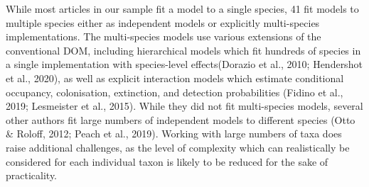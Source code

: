 \documentclass[
]{article}
\begin{document}
While most articles in our sample fit a model to a single species, 41
fit models to multiple species either as independent models or
explicitly multi-species implementations. The multi-species models use
various extensions of the conventional DOM, including hierarchical
models which fit hundreds of species in a single implementation with
species-level effects(Dorazio et al., 2010; Hendershot et al., 2020), as
well as explicit interaction models which estimate conditional
occupancy, colonisation, extinction, and detection probabilities (Fidino
et al., 2019; Lesmeister et al., 2015). While they did not fit
multi-species models, several other authors fit large numbers of
independent models to different species (Otto \& Roloff, 2012; Peach et
al., 2019). Working with large numbers of taxa does raise additional
challenges, as the level of complexity which can realistically be
considered for each individual taxon is likely to be reduced for the
sake of practicality.
\end{document}
